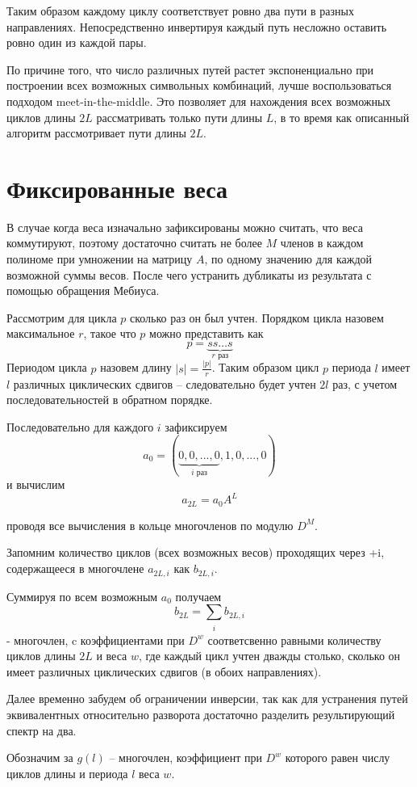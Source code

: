 \documentclass[specification,annotation,times]{itmo-student-thesis}
\begin{document}
Таким образом каждому циклу соответствует ровно два пути в разных направлениях. Непосредственно
инвертируя каждый путь несложно оставить ровно один из каждой пары.

По причине того, что число различных путей растет
экспоненциально при построении всех возможных символьных комбинаций, лучше воспользоваться подходом
meet-in-the-middle. Это позволяет для нахождения всех возможных циклов длины $2L$ рассматривать
только пути длины $L$, в то время как описанный алгоритм рассмотривает пути длины $2L$.

\section{Фиксированные веса}
В случае когда веса изначально зафиксированы можно считать, что веса коммутируют, поэтому достаточно
считать не более $M$ членов в каждом полиноме при умножении на матрицу $A$,
 по одному значению для каждой возможной суммы весов. После чего устранить дубликаты из результата с 
помощью обращения Мебиуса.

Рассмотрим для цикла $p$ сколько раз он был учтен. Порядком цикла назовем максимальное $r$, такое что
$p$ можно представить как 
\[
p=\underbrace{ss \ldots s}_{r \text{ раз}}
\]
Периодом цикла $p$ назовем длину $|s|=\frac{|p|}{r}$. Таким образом цикл $p$ 
периода $l$ имеет $l$ различных циклических сдвигов -- следовательно будет учтен $2l$ раз, с учетом
последовательностей в обратном порядке.

Последовательно для каждого $i$ зафиксируем
\[
a_0=(\underbrace{0,0,...,0}_{i \text{ раз}},1,0,...,0)
\]
и вычислим
\[
a_{2L}=a_0A^L
\]

проводя все вычисления в кольце многочленов по модулю $D^M$.

Запомним количество циклов (всех возможных весов) проходящих через +i, содержащееся в 
многочлене $a_{2L,i}$ как $b_{2L,i}$.

Суммируя по всем возможным $a_0$ получаем 
\[
b_{2L}=\sum_{\substack{i}}b_{2L,i}
\]
 - многочлен, c коэффициентами при $D^w$ соответсвенно равными количеству циклов длины $2L$ и веса $w$,
 где каждый цикл учтен дважды столько, сколько он имеет различных циклических
 сдвигов (в обоих направлениях).  

Далее временно забудем об ограничении инверсии, так как для устранения путей эквивалентных
относительно разворота достаточно разделить результирующий спектр на два.

Обозначим за $g(l)$ -- многочлен, коэффициент при $D^w$ которого равен числу циклов длины и периода $l$ веса $w$.
\end{document}
